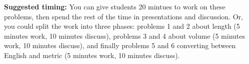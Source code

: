 \documentclass[nooutcomes,noauthor, handout]{ximera}
\begin{document}
\begin{instructorNotes}
{\bf Suggested timing: } You can give students 20 mintues to work on these problems, then spend the rest of the time in presentations and discussion. Or, you could split the work into three phases: problems 1 and 2 about length (5 minutes work, 10 minutes discuss), problems 3 and 4 about volume (5 minutes work, 10 minutes discuss), and finally problems 5 and 6 converting between English and metric (5 minutes work, 10 minutes discuss).

\end{instructorNotes}
\end{document}
